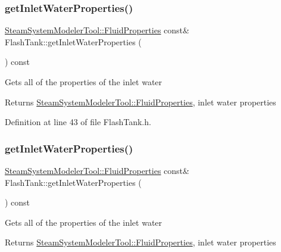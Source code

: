 \subsubsection{\texorpdfstring{get\+Inlet\+Water\+Properties()}{getInletWaterProperties()}\hspace{0.1cm}{\footnotesize\ttfamily [2/3]}}
{\footnotesize\ttfamily \hyperlink{struct_steam_system_modeler_tool_1_1_fluid_properties}{Steam\+System\+Modeler\+Tool\+::\+Fluid\+Properties} const\& Flash\+Tank\+::get\+Inlet\+Water\+Properties (\begin{DoxyParamCaption}{ }\end{DoxyParamCaption}) const\hspace{0.3cm}{\ttfamily [inline]}}

Gets all of the properties of the inlet water \begin{DoxyReturn}{Returns}
\hyperlink{struct_steam_system_modeler_tool_1_1_fluid_properties}{Steam\+System\+Modeler\+Tool\+::\+Fluid\+Properties}, inlet water properties 
\end{DoxyReturn}


Definition at line 43 of file Flash\+Tank.\+h.

\mbox{\label{class_flash_tank_a582b3e730f1619891533965940d692de}} 
\subsubsection{\texorpdfstring{get\+Inlet\+Water\+Properties()}{getInletWaterProperties()}\hspace{0.1cm}{\footnotesize\ttfamily [3/3]}}
{\footnotesize\ttfamily \hyperlink{struct_steam_system_modeler_tool_1_1_fluid_properties}{Steam\+System\+Modeler\+Tool\+::\+Fluid\+Properties} const\& Flash\+Tank\+::get\+Inlet\+Water\+Properties (\begin{DoxyParamCaption}{ }\end{DoxyParamCaption}) const\hspace{0.3cm}{\ttfamily [inline]}}

Gets all of the properties of the inlet water \begin{DoxyReturn}{Returns}
\hyperlink{struct_steam_system_modeler_tool_1_1_fluid_properties}{Steam\+System\+Modeler\+Tool\+::\+Fluid\+Properties}, inlet water properties 
\end{DoxyReturn}


